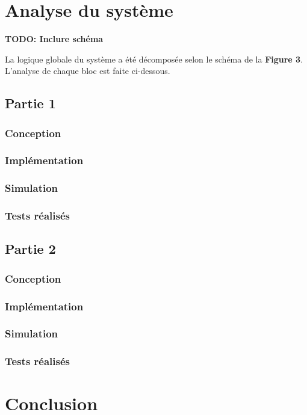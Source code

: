 \section{Analyse du système}

\begin{minipage}{\textwidth}
	\center
	\textbf{TODO: Inclure schéma}
\end{minipage}

La logique globale du système a été décomposée selon le schéma de la \textbf{Figure 3}. L'analyse de chaque bloc est faite ci-dessous.

\subsection{Partie 1}

\subsubsection{Conception}

\subsubsection{Implémentation}

\subsubsection{Simulation}

\subsubsection{Tests réalisés}

\subsection{Partie 2}

\subsubsection{Conception}

\subsubsection{Implémentation}

\subsubsection{Simulation}

\subsubsection{Tests réalisés}

\section{Conclusion}


